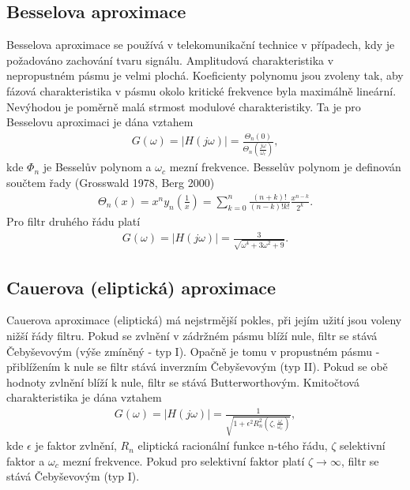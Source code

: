 \documentclass[twoside]{article}
\begin{document}
\subsection{Besselova aproximace}
Besselova aproximace se používá v telekomunikační technice v případech, kdy je požadováno zachování tvaru signálu. Amplitudová charakteristika v nepropustném pásmu je velmi plochá. Koeficienty polynomu jsou zvoleny tak, aby fázová charakteristika v pásmu okolo kritické frekvence byla maximálně lineární. Nevýhodou je poměrně malá strmost modulové charakteristiky. Ta je pro Besselovu aproximaci je dána vztahem
\begin{align}
G(\omega) = |H(j\omega)| = \frac{\Theta _n(0)}{\Theta _n(\frac{j\omega}{\omega _c})},
\end{align}
kde $\Phi _n$ je Besselův polynom a $\omega _c$ mezní frekvence. Besselův polynom je definován součtem řady (Grosswald 1978, Berg 2000)
\begin{align}
\Theta _n (x) = x^n y_n (\frac{1}{x}) = \sum_{k=0}^{n}\frac{(n+k)!}{(n-k)!k!}\frac{x^{n-k}}{2^k}.
\end{align}
Pro filtr druhého řádu platí
\begin{align}
G(\omega) = |H(j\omega)| = \frac{3}{\sqrt{\omega ^4 + 3\omega ^2 + 9}}.
\end{align}
\subsection{Cauerova (eliptická) aproximace}
\noindent Cauerova aproximace (eliptická) má nejstrmější pokles, při jejím užití jsou voleny nižší řády filtru. Pokud se zvlnění v zádržném pásmu blíží nule, filtr se stává Čebyševovým (výše zmíněný - typ I). Opačně je tomu v propustném pásmu - přiblížením k nule se filtr stává inverzním Čebyševovým (typ II).  Pokud se obě hodnoty zvlnění blíží k nule, filtr se stává Butterworthovým. Kmitočtová charakteristika je dána vztahem
\begin{align}
G(\omega) = |H(j\omega)| = \frac{1}{\sqrt{1 + \epsilon ^2 R_n ^2(\zeta, \frac{\omega}{\omega _c})}},
\end{align}
kde $\epsilon$ je faktor zvlnění, $R_n$ eliptická racionální funkce n-tého řádu, $\zeta$ selektivní faktor a $\omega _c$ mezní frekvence. Pokud pro selektivní faktor platí $\zeta \rightarrow \infty$, filtr se stává Čebyševovým (typ I). 
\end{document}
